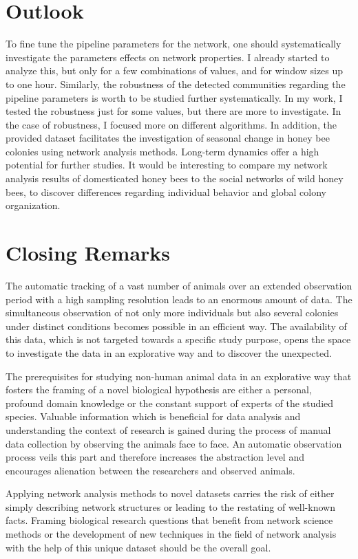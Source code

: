 \section{Outlook}
To fine tune the pipeline parameters for the network, one should systematically investigate the parameters effects on network properties. I already started to analyze this, but only for a few combinations of values, and for window sizes up to one hour.
Similarly, the robustness of the detected communities regarding the pipeline parameters is worth to be studied further systematically.
In my work, I tested the robustness just for some values, but there are more to investigate. In the case of robustness, I  focused more on different algorithms.
In addition, the provided dataset facilitates the investigation of seasonal change in honey bee colonies using network analysis methods. Long-term dynamics offer a high potential for further studies. It would be interesting to compare my network analysis results of domesticated honey bees to the social networks of wild honey bees, to discover differences regarding individual behavior and global colony organization.


\section{Closing Remarks}
The automatic tracking of a vast number of animals over an extended observation period with a high sampling resolution leads to an enormous amount of data.
The simultaneous observation of not only more individuals but also several colonies under distinct conditions becomes possible in an efficient way.
The availability of this data, which is not targeted towards a specific study purpose, opens the space to investigate the data in an explorative way and to discover the unexpected.

The prerequisites for studying non-human animal data in an explorative way that fosters the framing of a novel biological hypothesis are either a personal, profound domain knowledge or the constant support of experts of the studied species.
Valuable information which is beneficial for data analysis and understanding the context of research is gained during the process of manual data collection by observing the animals face to face.
An automatic observation process veils this part and therefore increases the abstraction level and encourages alienation between the researchers and observed animals.

Applying network analysis methods to novel datasets carries the risk of either simply describing network structures or leading to the restating of well-known facts.
Framing biological research questions that benefit from network science methods or the development of new techniques in the field of network analysis with the help of this unique dataset should be the overall goal.